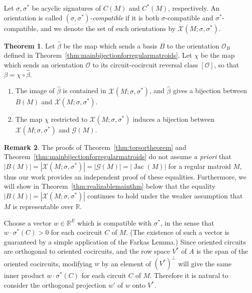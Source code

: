 \documentclass[12pt]{amsart}
\numberwithin{equation}{section}
\theoremstyle{definition}
\newtheorem{theorem}{Theorem}[subsection]
\newtheorem{remark}[theorem]{Remark}
\newcommand{\Jac}{\operatorname{Jac}}
\begin{document}
Let $\sigma,\sigma^*$ be acyclic signatures of $C(M)$ and $C^*(M)$, respectively. An orientation is called {\em $(\sigma,\sigma^*)$-compatible} if it is both $\sigma$-compatible and $\sigma^*$-compatible, and we denote the set of such orientations by $\mathcal{X}(M;\sigma,\sigma^*)$.

\begin{theorem} \label{thm:SScompatibleorientation}
Let $\hat{\beta}$ be the map which sends a basis $B$ to the orientation $\mathcal{O}_B$ defined in Theorem~\ref{thm:mainbijectionforregularmatroids}. Let $\chi$ be the map which sends an orientation $\mathcal{O}$ to its circuit-cocircuit reversal class $[\mathcal{O}]$, so that  
 $\beta=\chi\circ\hat{\beta}$.  
\begin{enumerate}
\item The image of $\hat{\beta}$ is contained in $\mathcal{X}(M;\sigma,\sigma^*)$, and $\hat{\beta}$ gives a bijection between $B(M)$ and $\mathcal{X}(M;\sigma,\sigma^*)$.
\item The map $\chi$ restricted to $\mathcal{X}(M;\sigma,\sigma^*)$ induces a bijection between $\mathcal{X}(M;\sigma,\sigma^*)$ and $\mathcal{G}(M)$. 
\end{enumerate}
\end{theorem}

\begin{remark}
The proofs of Theorem~\ref{thm:torsortheorem} and Theorem~\ref{thm:mainbijectionforregularmatroids} do not assume {\em a priori} that  $|B(M)|=|\mathcal{X}(M;\sigma,\sigma^*)|=|\mathcal{G}(M)|=|\Jac(M)|$ for a regular matroid $M$, thus our work provides an independent proof of these equalities. Furthermore, we will show in Theorem~\ref{thm:realizablemainthm} below that the equality $|B(M)|=|\mathcal{X}(M;\sigma,\sigma^*)|$ continues to hold under the weaker assumption that $M$ is representable over $\mathbb{R}$.
\end{remark}

\medskip

Choose a vector $w \in {\mathbb R}^E$ which is compatible with $\sigma^*$, in the sense that $w \cdot \sigma^*(C) > 0$ for each cocircuit $C$ of $M$.
(The existence of such a vector is guaranteed by a simple application of the Farkas Lemma.) 
Since oriented circuits are orthogonal to oriented cocircuits, and the row space $V^*$ of $A$ is the span of the oriented cocircuits, 
modifying $w$ by an element of $(V^*)^\perp$ will give the same inner product $w \cdot \sigma^*(C)$ for each circuit $C$ of $M$.
Therefore it is natural to consider the orthogonal projection $w'$ of $w$ onto $V^*$.
\end{document}
